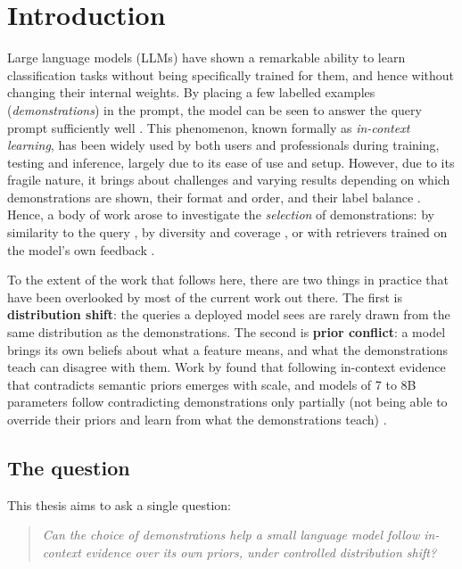 \chapter{Introduction}
\label{ch:intro}

Large language models (LLMs) have shown a remarkable ability to learn classification tasks without being specifically trained for them, and hence without changing their internal weights. By placing a few labelled examples (\emph{demonstrations}) in the prompt, the model can be seen to answer the query prompt sufficiently well \citep{brown2020language, dong2024survey}. This phenomenon, known formally as \emph{in-context learning}, has been widely used by both users and professionals during training, testing and inference, largely due to its ease of use and setup. However, due to its fragile nature, it brings about challenges and varying results depending on which demonstrations are shown, their format and order, and their label balance \citep{zhao2021calibrate, lu2022fantastically, min2022rethinking}. Hence, a body of work arose to investigate the \emph{selection} of demonstrations: by similarity to the query \citep{liu2022what}, by diversity and coverage \citep{levy2023diverse,gupta2023coverage}, or with retrievers trained on the model's own feedback \citep{rubin2022learning,li2023unified,ye2023compositional}.


To the extent of the work that follows here, there are two things in practice that have been overlooked by most of the current work out there. 
The first is \textbf{distribution shift}: the queries a deployed model sees are rarely drawn from the same distribution as the demonstrations.
The second is \textbf{prior conflict}: a model brings its own beliefs about what a feature means, and what the demonstrations teach can disagree with them. Work by \citet{wei2023larger} found that following in-context evidence that contradicts semantic priors emerges with scale, and models of 7 to 8B parameters follow contradicting demonstrations only partially (not being able to override their priors and learn from what the demonstrations teach) \citep{krishnakumar2025semantic,kossen2024incontext}.


\newpage
\section{The question}

This thesis aims to ask a single question:

\begin{quote}
\textit{Can the choice of demonstrations help a small language model follow in-context evidence over its own priors, under controlled distribution shift?}
\end{quote}

